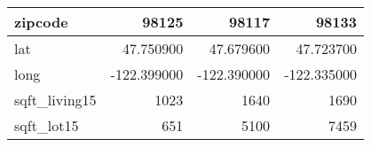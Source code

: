 \begin{table}[H]
\begin{tabular}{|l|r|r|r|}
\hline zipcode & \cellcolor[rgb]{0.9, 0.54, 0.52} 98125 & 98117 & 98133 \\
\hline lat & \cellcolor[rgb]{0.9, 0.54, 0.52} 47.750900 & 47.679600 & 47.723700 \\
\hline long & \cellcolor[rgb]{0.9, 0.54, 0.52} -122.399000 & \cellcolor[rgb]{0.9, 0.54, 0.52} -122.390000 & \cellcolor[rgb]{0.9, 0.54, 0.52} -122.335000 \\
\hline sqft\_living15 & \cellcolor[rgb]{0.9, 0.54, 0.52} 1023 & 1640 & 1690 \\
\hline sqft\_lot15 & \cellcolor[rgb]{0.9, 0.54, 0.52} 651 & 5100 & 7459 \\
\hline
\end{tabular}
\end{table}
